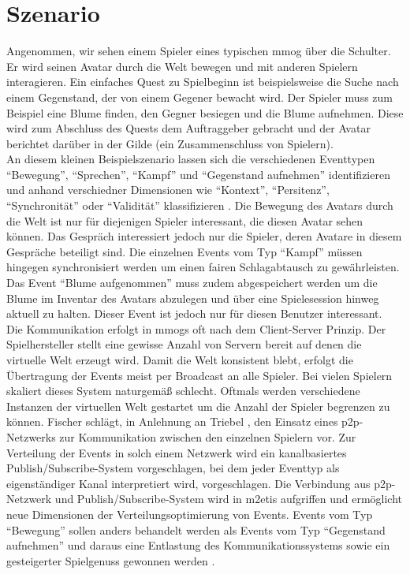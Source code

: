 \section{Szenario}
\label{chap:grundlagen:szenario}
Angenommen, wir sehen einem Spieler eines typischen \ac{mmog} über die Schulter. Er wird seinen Avatar durch die Welt bewegen und mit anderen Spielern interagieren. Ein einfaches Quest zu Spielbeginn ist beispielsweise die Suche nach einem Gegenstand, der von einem Gegener bewacht wird. Der Spieler muss zum Beispiel eine Blume finden, den Gegner besiegen und die Blume aufnehmen. Diese wird zum Abschluss des Quests dem Auftraggeber gebracht und der Avatar berichtet darüber in der Gilde (ein Zusammenschluss von Spielern).\\
An diesem kleinen Beispielszenario lassen sich die verschiedenen Eventtypen ``Bewegung'', ``Sprechen'', ``Kampf'' und ``Gegenstand aufnehmen'' identifizieren und anhand verschiedner Dimensionen wie ``Kontext'', ``Persitenz'', ``Synchronität'' oder ``Validität'' klassifizieren \cite{Fischer2010Event}. Die Bewegung des Avatars durch die Welt ist nur für diejenigen Spieler interessant, die diesen Avatar sehen können. Das Gespräch interessiert jedoch nur die Spieler, deren Avatare in diesem Gespräche beteiligt sind. Die einzelnen Events vom Typ ``Kampf'' müssen hingegen synchronisiert werden um einen fairen Schlagabtausch zu gewährleisten. Das Event ``Blume aufgenommen'' muss zudem abgespeichert werden um die Blume im Inventar des Avatars abzulegen und über eine Spielesession hinweg aktuell zu halten. Dieser Event ist jedoch nur für diesen Benutzer interessant.\\
Die Kommunikation erfolgt in \acp{mmog} oft nach dem Client-Server Prinzip. Der Spielhersteller stellt eine gewisse Anzahl von Servern bereit auf denen die virtuelle Welt erzeugt wird. Damit die Welt konsistent blebt, erfolgt die Übertragung der Events meist per Broadcast an alle Spieler. Bei vielen Spielern skaliert dieses System naturgemäß schlecht. Oftmals werden verschiedene Instanzen der virtuellen Welt gestartet um die Anzahl der Spieler begrenzen zu können. Fischer schlägt, in Anlehnung an Triebel \cite{Triebel2008Peertopeer}, den Einsatz eines \ac{p2p}-Netzwerks zur Kommunikation zwischen den einzelnen Spielern vor. Zur Verteilung der Events in solch einem Netzwerk wird ein kanalbasiertes Publish/Subscribe-System vorgeschlagen, bei dem jeder Eventtyp als eigenständiger Kanal interpretiert wird, vorgeschlagen. Die Verbindung aus \ac{p2p}-Netzwerk und Publish/Subscribe-System wird in \ac{m2etis} aufgriffen und ermöglicht neue Dimensionen der Verteilungsoptimierung von Events. Events vom Typ ``Bewegung'' sollen anders behandelt werden als Events vom Typ ``Gegenstand aufnehmen'' und daraus eine Entlastung des Kommunikationssystems sowie ein gesteigerter Spielgenuss gewonnen werden  \cite{Fischer2010a}.
